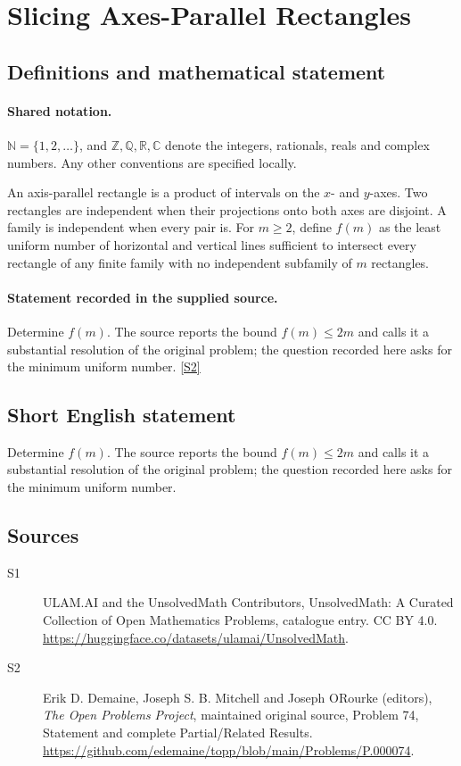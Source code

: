 \documentclass[11pt]{article}
\newcommand{\sref}[2]{\hyperlink{source:#1:#2}{[S#2]}}
\begin{document}
\section{Slicing Axes-Parallel Rectangles}\label{statement}

\subsection{Definitions and mathematical statement}

\paragraph{Shared notation.}$\mathbb N=\{1,2,\ldots\}$, and $\mathbb Z,\mathbb Q,\mathbb R,\mathbb C$ denote the integers, rationals, reals and complex numbers. Any other conventions are specified locally.


An axis-parallel rectangle is a product of intervals on the $x$- and $y$-axes. Two rectangles are independent when their projections onto both axes are disjoint. A family is independent when every pair is. For $m\ge2$, define $f(m)$ as the least uniform number of horizontal and vertical lines sufficient to intersect every rectangle of any finite family with no independent subfamily of $m$ rectangles.
\paragraph{Statement recorded in the supplied source.}
Determine $f(m)$. The source reports the bound $f(m)\le2m$ and calls it a substantial resolution of the original problem; the question recorded here asks for the minimum uniform number. \sref{statement}{2}
\subsection{Short English statement}
Determine $f(m)$. The source reports the bound $f(m)\le2m$ and calls it a substantial resolution of the original problem; the question recorded here asks for the minimum uniform number.
\subsection{Sources}
\begin{description}
\item[\hypertarget{source:statement:1}{S1}] ULAM.AI and the UnsolvedMath Contributors, UnsolvedMath: A Curated Collection of Open Mathematics Problems, catalogue entry. CC BY 4.0. \url{https://huggingface.co/datasets/ulamai/UnsolvedMath}.
\item[\hypertarget{source:statement:2}{S2}] Erik D. Demaine, Joseph S. B. Mitchell and Joseph O\textquotesingle Rourke (editors), \emph{The Open Problems Project}, maintained original source, Problem 74, Statement and complete Partial/Related Results. \url{https://github.com/edemaine/topp/blob/main/Problems/P.000074}.
\end{description}
\label{end:statement}
\end{document}
